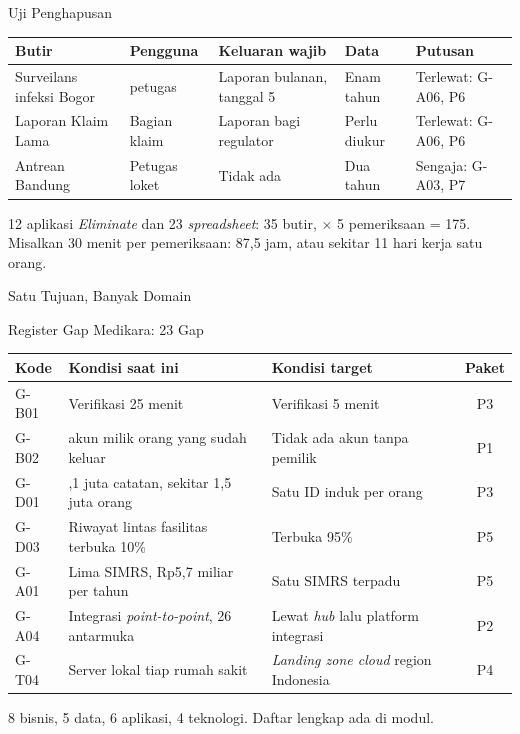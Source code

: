\documentclass[aspectratio=169, table, 12pt]{beamer}
\begin{document}
\begin{frame}{{\Large Uji Penghapusan}}
  \footnotesize
  \begin{tabularx}{\textwidth}{>{\raggedright\arraybackslash}p{2.8cm}>{\raggedright\arraybackslash}p{2.6cm}>{\raggedright\arraybackslash}X>{\raggedright\arraybackslash}p{2cm}>{\raggedright\arraybackslash}X}
    \hline
    \textbf{Butir} & \textbf{Pengguna} & \textbf{Keluaran wajib} & \textbf{Data} & \textbf{Putusan} \\ \hline
    Surveilans infeksi Bogor & 3 petugas & Laporan bulanan, tanggal 5 & Enam tahun & Terlewat: G-A06, P6 \\ \hline
    Laporan Klaim Lama & Bagian klaim & Laporan bagi regulator & Perlu diukur & Terlewat: G-A06, P6 \\ \hline
    Antrean Bandung & Petugas loket & Tidak ada & Dua tahun & Sengaja: G-A03, P7 \\ \hline
  \end{tabularx}

  \vspace{8pt}
  \small 12 aplikasi \textit{Eliminate} dan 23 \textit{spreadsheet}: 35 butir, $\times$ 5 pemeriksaan = 175.
  Misalkan 30 menit per pemeriksaan: 87,5 jam, atau sekitar 11 hari kerja satu orang.
\end{frame}

\begin{frame}{{\Large Satu Tujuan, Banyak Domain}}
  \centering
  \begin{figure}
  \end{figure}
\end{frame}

\begin{frame}{{\Large Register Gap Medikara: 23 Gap}}
  \footnotesize
  \begin{tabularx}{\textwidth}{l>{\raggedright\arraybackslash}X>{\raggedright\arraybackslash}Xc}
    \hline
    \textbf{Kode} & \textbf{Kondisi saat ini} & \textbf{Kondisi target} & \textbf{Paket} \\ \hline
    G-B01 & Verifikasi 25 menit & Verifikasi 5 menit & P3 \\ \hline
    G-B02 & 212 akun milik orang yang sudah keluar & Tidak ada akun tanpa pemilik & P1 \\ \hline
    G-D01 & 2,1 juta catatan, sekitar 1,5 juta orang & Satu ID induk per orang & P3 \\ \hline
    G-D03 & Riwayat lintas fasilitas terbuka 10\% & Terbuka 95\% & P5 \\ \hline
    G-A01 & Lima SIMRS, Rp5,7 miliar per tahun & Satu SIMRS terpadu & P5 \\ \hline
    G-A04 & Integrasi \textit{point-to-point}, 26 antarmuka & Lewat \textit{hub} lalu platform integrasi & P2 \\ \hline
    G-T04 & Server lokal tiap rumah sakit & \textit{Landing zone cloud} region Indonesia & P4 \\ \hline
  \end{tabularx}

  \vspace{6pt}
  \small 8 bisnis, 5 data, 6 aplikasi, 4 teknologi. Daftar lengkap ada di modul.
\end{frame}
\end{document}
